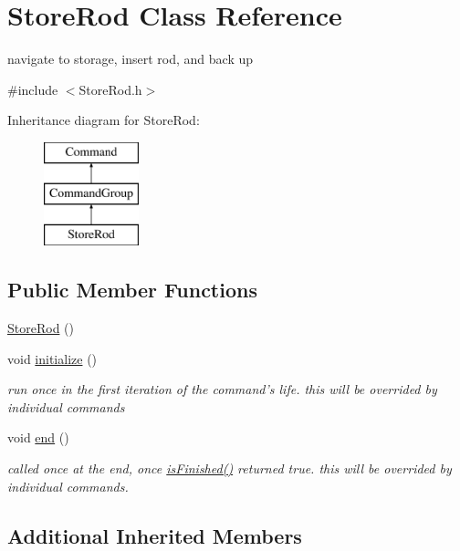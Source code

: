 \hypertarget{classStoreRod}{\section{Store\-Rod Class Reference}
\label{classStoreRod}
}


navigate to storage, insert rod, and back up  




{\ttfamily \#include $<$Store\-Rod.\-h$>$}

Inheritance diagram for Store\-Rod\-:\begin{figure}[H]
\begin{center}
\leavevmode
\includegraphics[height=3.000000cm]{classStoreRod}
\end{center}
\end{figure}
\subsection*{Public Member Functions}
\begin{DoxyCompactItemize}
\item 
\hyperlink{classStoreRod_aa93884f16d225969adecca7efc75d900}{Store\-Rod} ()
\item 
void \hyperlink{classStoreRod_adc7dcbbc465900aebefe4b990e88f74a}{initialize} ()
\begin{DoxyCompactList}\small\item\em run once in the first iteration of the command's life. this will be overrided by individual commands \end{DoxyCompactList}\item 
void \hyperlink{classStoreRod_a2fe691b28cb7c6942242caa35e43eecb}{end} ()
\begin{DoxyCompactList}\small\item\em called once at the end, once \hyperlink{classCommandGroup_a96807a2763adf9e21ebf2cb9e3574e3c}{is\-Finished()} returned true. this will be overrided by individual commands. \end{DoxyCompactList}\end{DoxyCompactItemize}
\subsection*{Additional Inherited Members}



